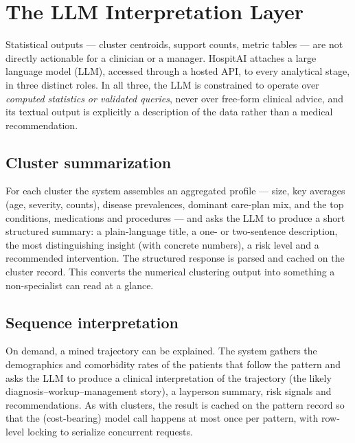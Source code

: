 \section{The LLM Interpretation Layer}\label{sec:llm}

Statistical outputs --- cluster centroids, support counts, metric tables --- are
not directly actionable for a clinician or a manager. HospitAI attaches a large
language model (LLM), accessed through a hosted API, to every analytical stage,
in three distinct roles. In all three, the LLM is constrained to operate over
\emph{computed statistics or validated queries}, never over free-form clinical
advice, and its textual output is explicitly a description of the data rather
than a medical recommendation.

\subsection{Cluster summarization}
For each cluster the system assembles an aggregated profile --- size,
key averages (age, severity, counts), disease prevalences, dominant care-plan
mix, and the top conditions, medications and procedures --- and asks the LLM to
produce a short structured summary: a plain-language title, a one- or two-sentence
description, the most distinguishing insight (with concrete numbers), a risk
level and a recommended intervention. The structured response is parsed and
cached on the cluster record. This converts the numerical clustering output into
something a non-specialist can read at a glance.

\subsection{Sequence interpretation}
On demand, a mined trajectory can be explained. The system gathers the
demographics and comorbidity rates of the patients that follow the pattern and
asks the LLM to produce a clinical interpretation of the trajectory (the likely
diagnosis--workup--management story), a layperson summary, risk signals and
recommendations. As with clusters, the result is cached on the pattern record so
that the (cost-bearing) model call happens at most once per pattern, with
row-level locking to serialize concurrent requests.

